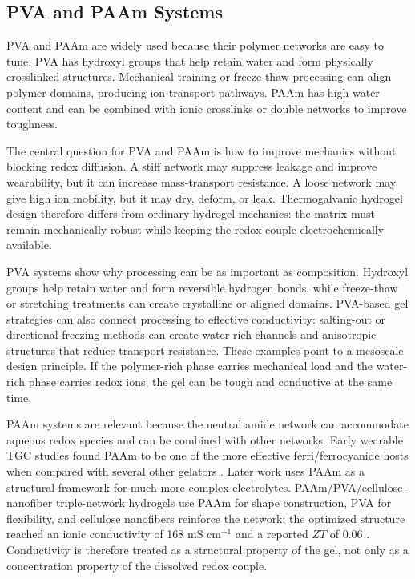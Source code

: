 \subsection{PVA and PAAm Systems}

PVA and PAAm are widely used because their polymer networks are easy to tune.
PVA has hydroxyl groups that help retain water and form physically crosslinked
structures. Mechanical training or freeze-thaw processing can align polymer
domains, producing ion-transport pathways. PAAm has high water content and can
be combined with ionic crosslinks or double networks to improve toughness.

The central question for PVA and PAAm is how to improve mechanics without
blocking redox diffusion. A stiff network may suppress leakage and improve
wearability, but it can increase mass-transport resistance. A loose network may
give high ion mobility, but it may dry, deform, or leak. Thermogalvanic hydrogel
design therefore differs from ordinary hydrogel mechanics: the matrix must
remain mechanically robust while keeping the redox couple electrochemically
available.

PVA systems show why processing can be as important as composition. Hydroxyl
groups help retain water and form reversible hydrogen bonds, while freeze-thaw
or stretching treatments can create crystalline or aligned domains. PVA-based
gel strategies can also connect processing to effective conductivity:
salting-out or directional-freezing
methods can create water-rich channels and anisotropic structures that reduce
transport resistance. These examples point to a
mesoscale design principle. If the polymer-rich phase carries mechanical load
and the water-rich phase carries redox ions, the gel can be tough and conductive
at the same time.

PAAm systems are relevant because the neutral amide network can accommodate
aqueous redox species and can be combined with other networks. Early wearable
TGC studies found PAAm to be one of the more effective ferri/ferrocyanide hosts
when compared with several other gelators \citep{russo2019hydrogels}. Later work
uses PAAm as a structural framework for much more complex electrolytes.
PAAm/PVA/cellulose-nanofiber triple-network hydrogels use
PAAm for shape construction, PVA for flexibility, and cellulose
nanofibers reinforce the network; the optimized structure reached an ionic
conductivity of 168 mS cm$^{-1}$ and a reported $ZT$ of 0.06
\citep{lin2024triple}. Conductivity is therefore treated as a structural
property of the gel, not only as a concentration
property of the dissolved redox couple.

